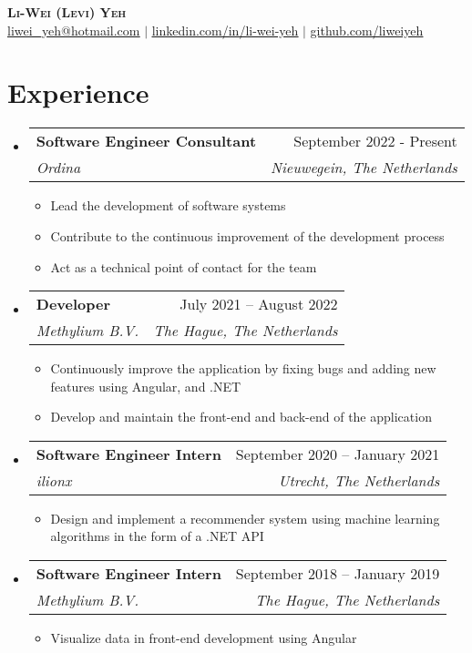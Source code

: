 \documentclass[letterpaper,11pt]{article}
\makeatletter
\newcommand{\resumeItem}[1]{
	\item\small{
		{#1 \vspace{-2pt}}
	}
}
\newcommand{\resumeSubheading}[4]{
	\vspace{4pt}\item
	\begin{tabular*}{0.97\textwidth}[t]{l@{\extracolsep{\fill}}r}
		\textbf{#1} & #2 \\
		\textit{\small#3} & \textit{\small #4} \\
	\end{tabular*}\vspace{-7pt}
}
\newcommand{\resumeSubHeadingListStart}{\begin{itemize}[leftmargin=0.15in, label={}]}
\newcommand{\resumeSubHeadingListEnd}{\end{itemize}}
\newcommand{\resumeItemListStart}{\begin{itemize}}
\newcommand{\resumeItemListEnd}{\end{itemize}\vspace{-5pt}}
\makeatother
\begin{document}
	
	\begin{center}
		\textbf{\Huge \scshape Li-Wei (Levi) Yeh} \\ \vspace{1pt}
		\small \href{mailto:liwei_yeh@hotmail.com}{\underline{liwei\_yeh@hotmail.com}} $|$ 
		\href{https://www.linkedin.com/in/li-wei-yeh/}{\underline{linkedin.com/in/li-wei-yeh}} $|$
		\href{https://github.com/LiWeiYeh/}{\underline{github.com/liweiyeh}}
	\end{center}
	
	
	
	\section{Experience}
	\resumeSubHeadingListStart
	
	\resumeSubheading
	{Software Engineer Consultant}{September 2022 - Present}
	{Ordina}{Nieuwegein, The Netherlands}
	\resumeItemListStart
	\resumeItem{Lead the development of software systems}\\
	\resumeItem{Contribute to the continuous improvement of the development process}\\
	\resumeItem{Act as a technical point of contact for the team}\\
	\resumeItemListEnd
	
	\resumeSubheading
	{Developer}{July 2021 – August 2022}
	{Methylium B.V.}{The Hague, The Netherlands}
	\resumeItemListStart
	\resumeItem{Continuously improve the application by fixing bugs and adding new\\ 
		features using Angular, and .NET}
	\resumeItem{Develop and maintain the front-end and back-end of the application}
	\resumeItemListEnd
	
	\resumeSubheading
	{Software Engineer Intern}{September 2020 -- January 2021}
	{ilionx}{Utrecht, The Netherlands}
	\resumeItemListStart
	\resumeItem{Design and implement a recommender system using machine learning\\
		algorithms in the form of a .NET API}
	\resumeItemListEnd
	
	\resumeSubheading
	{Software Engineer Intern}{September 2018 -- January 2019}
	{Methylium B.V.}{The Hague, The Netherlands}
	\resumeItemListStart
	\resumeItem{Visualize data in front-end development using Angular}
	\resumeItemListEnd
	
	\resumeSubHeadingListEnd
	
	
	
\end{document}
